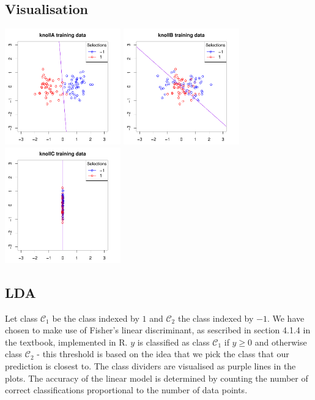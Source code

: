 \documentclass[a4paper, oneside, final]{memoir}
\begin{document}
\subsection*{Visualisation}
\includegraphics[width=5cm]{img/question2-plot-a.pdf}
\includegraphics[width=5cm]{img/question2-plot-b.pdf}
\includegraphics[width=5cm]{img/question2-plot-c.pdf}

\subsection*{LDA}

Let class $\mathcal{C}_1$ be the class indexed by $1$ and
$\mathcal{C}_2$ the class indexed by $-1$.  We have chosen to make use
of Fisher's linear discriminant, as sescribed in section 4.1.4 in the
textbook, implemented in R.  $y$ is classified as class
$\mathcal{C}_1$ if $y\geq 0$ and otherwise class $\mathcal{C}_2$ -
this threshold is based on the idea that we pick the class that our
prediction is closest to.  The class dividers are visualised as purple
lines in the plots.  The accuracy of the linear model is determined by
counting the number of correct classifications proportional to the
number of data points.
\end{document}
